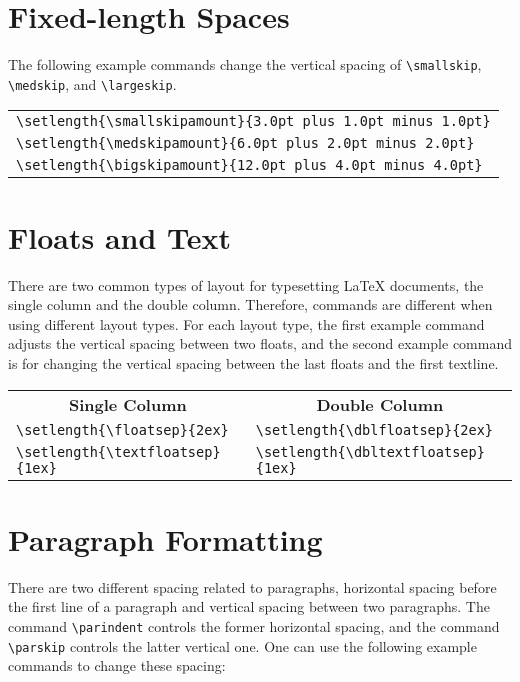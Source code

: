 \section{Fixed-length Spaces}

The following example commands change the vertical spacing of \verb|\smallskip|, \verb|\medskip|, and \verb|\largeskip|.

\begin{tabular}{l}
    \verb|\setlength{\smallskipamount}{3.0pt plus 1.0pt minus 1.0pt}| \\
    \verb|\setlength{\medskipamount}{6.0pt plus 2.0pt minus 2.0pt}| \\
    \verb|\setlength{\bigskipamount}{12.0pt plus 4.0pt minus 4.0pt}|
\end{tabular}

\section{Floats and Text}

There are two common types of layout for typesetting \LaTeX{} documents, the single column and the double column. Therefore, commands are different when using different layout types. For each layout type, the first example command adjusts the vertical spacing between two floats, and the second example command is for changing the vertical spacing between the last floats and the first textline.

\begin{tabular}{ll}
    \multicolumn{1}{c}{\textbf{Single Column}} & \multicolumn{1}{c}{\textbf{Double Column}} \\
    \verb|\setlength{\floatsep}{2ex}| & \verb|\setlength{\dblfloatsep}{2ex}| \\
    \verb|\setlength{\textfloatsep}{1ex}| & \verb|\setlength{\dbltextfloatsep}{1ex}|
\end{tabular}

\section{Paragraph Formatting}

There are two different spacing related to paragraphs, horizontal spacing before the first line of a paragraph and vertical spacing between two paragraphs. The command \verb|\parindent| controls the former horizontal spacing, and the command \verb|\parskip| controls the latter vertical one. One can use the following example commands to change these spacing:

